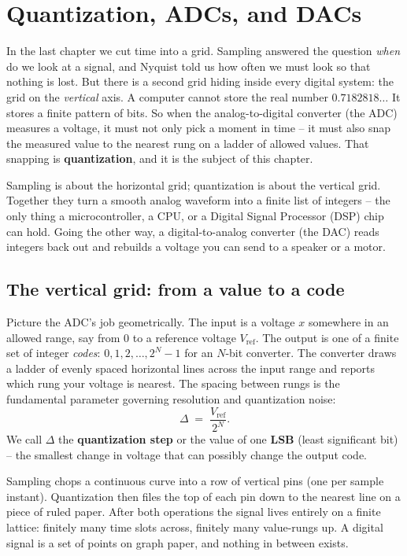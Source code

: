 \chapter{Quantization, ADCs, and DACs}

\chapterline

In the last chapter we cut time into a grid. Sampling answered the question \emph{when} do we
look at a signal, and Nyquist told us how often we must look so that nothing is lost. But there
is a second grid hiding inside every digital system: the grid on the \emph{vertical} axis. A computer cannot store the real number
$0.7182818\ldots$ It stores a finite pattern of bits. So when the analog-to-digital converter
(the ADC) measures a voltage, it must not only pick a moment in time -- it must also snap the
measured value to the nearest rung on a ladder of allowed values. That snapping is
\textbf{quantization}, and it is the subject of this chapter.

Sampling is about the horizontal grid; quantization is about the vertical grid. Together they
turn a smooth analog waveform into a finite list of integers -- the only thing a microcontroller,
a CPU, or a Digital Signal Processor (DSP) chip can hold. Going the other way, a digital-to-analog converter (the
DAC) reads integers back out and rebuilds a voltage you can send to a speaker or a motor.

\section{The vertical grid: from a value to a code}
\label{ch19:vertical-grid}

Picture the ADC's job geometrically. The input is a voltage $x$ somewhere in an allowed range,
say from $0$ to a reference voltage $V_{\mathrm{ref}}$. The output is one of a finite set of
integer \emph{codes}: $0, 1, 2, \ldots, 2^N - 1$ for an $N$-bit converter. The converter draws a
ladder of evenly spaced horizontal lines across the input range and reports which rung your
voltage is nearest. The spacing between rungs is the fundamental parameter governing
resolution and quantization noise:
\[
  \Delta \;=\; \frac{V_{\mathrm{ref}}}{2^N}.
\]
We call $\Delta$ the \textbf{quantization step} or the value of one \textbf{LSB} (least
significant bit) -- the smallest change in voltage that can possibly change the output code.

\begin{intuitionbox}
Sampling chops a continuous curve into a row of vertical pins (one per sample instant).
Quantization then files the top of each pin down to the nearest line on a piece of ruled paper.
After both operations the signal lives entirely on a finite lattice: finitely many time slots
across, finitely many value-rungs up. A digital signal is a set of points on graph paper, and
nothing in between exists.
\end{intuitionbox}


